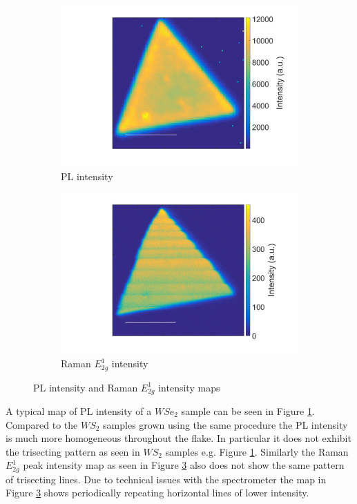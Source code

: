 \begin{figure}[H]
	\begin{center}
		\begin{subfigure}[b]{0.45\textwidth}
			\includegraphics[width=\textwidth]{WSe2/PLIntensity.png}
			\caption{PL intensity}
			\label{fig:WSe2PLIntensityMap}
		\end{subfigure}
		\qquad
		\begin{subfigure}[b]{0.45\textwidth}
			\includegraphics[width=\textwidth]{WSe2/RamanEIntensity.png}
			\caption{Raman $E^1_{2g}$ intensity}
			\label{fig:WSe2RamanIntensityMap}
		\end{subfigure}
		\caption{PL intensity and Raman $E^1_{2g}$ intensity maps}
	\end{center}
\end{figure}

A typical map of PL intensity of a $WSe_2$ sample can be seen in Figure \ref{fig:WSe2PLIntensityMap}. Compared to the $WS_2$ samples grown using the same procedure the PL intensity is much more homogeneous throughout the flake. In particular it does not exhibit the trisecting pattern as seen in $WS_2$ samples e.g. Figure \ref{fig:WSe2PLIntensityMap}. Similarly the Raman $E^1_{2g}$ peak intensity map as seen in Figure \ref{fig:WSe2RamanIntensityMap} also does not show the same pattern of trisecting lines. Due to technical issues with the spectrometer the map in Figure \ref{fig:WSe2RamanIntensityMap} shows periodically repeating horizontal lines of lower intensity.
	
